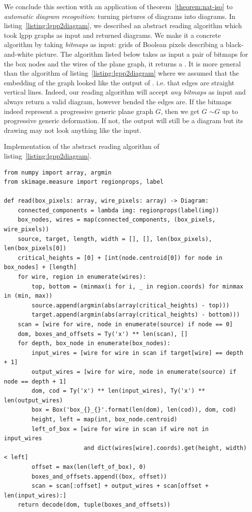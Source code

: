 We conclude this section with an application of theorem~\ref{theorem:nat-iso} to \emph{automatic diagram recognition}: turning pictures of diagrams into diagrams.
In listing~\ref{listing:lgpp2diagram}, we described an abstract reading algorithm which took lgpp graphs as input and returned diagrams.
We make it a concrete algorithm by taking \emph{bitmaps} as input: grids of Boolean pixels describing a black-and-white picture.
The algorithm  listed below takes as input a pair of bitmaps for the box nodes and the wires of the plane graph, it returns a .
It is more general than the  algorithm of listing~\ref{listing:lgpp2diagram} where we assumed that the embedding of the graph looked like the output of . i.e. that edges are straight vertical lines.
Indeed, our reading algorithm will accept \emph{any bitmaps} as input and always return a valid diagram, however bended the edges are.
If the bitmaps indeed represent a progressive generic plane graph $G$, then we get  $G$  $\sim G$ up to progressive generic deformation.
If not, the output will still be a diagram but its drawing may not look anything like the input.

\begin{python}
{\normalfont Implementation of the abstract reading algorithm of listing~\ref{listing:lgpp2diagram}.}

\begin{verbatim}
from numpy import array, argmin
from skimage.measure import regionprops, label

def read(box_pixels: array, wire_pixels: array) -> Diagram:
    connected_components = lambda img: regionprops(label(img))
    box_nodes, wires = map(connected_components, (box_pixels, wire_pixels))
    source, target, length, width = [], [], len(box_pixels), len(box_pixels[0])
    critical_heights = [0] + [int(node.centroid[0]) for node in box_nodes] + [length]
    for wire, region in enumerate(wires):
        top, bottom = (minmax(i for i, _ in region.coords) for minmax in (min, max))
        source.append(argmin(abs(array(critical_heights) - top)))
        target.append(argmin(abs(array(critical_heights) - bottom)))
    scan = [wire for wire, node in enumerate(source) if node == 0]
    dom, boxes_and_offsets = Ty('x') ** len(scan), []
    for depth, box_node in enumerate(box_nodes):
        input_wires = [wire for wire in scan if target[wire] == depth + 1]
        output_wires = [wire for wire, node in enumerate(source) if node == depth + 1]
        dom, cod = Ty('x') ** len(input_wires), Ty('x') ** len(output_wires)
        box = Box('box_{}_{}'.format(len(dom), len(cod)), dom, cod)
        height, left = map(int, box_node.centroid)
        left_of_box = [wire for wire in scan if wire not in input_wires
                       and dict(wires[wire].coords).get(height, width) < left]
        offset = max(len(left_of_box), 0)
        boxes_and_offsets.append((box, offset))
        scan = scan[:offset] + output_wires + scan[offset + len(input_wires):]
    return decode(dom, tuple(boxes_and_offsets))
\end{verbatim}
\end{python}

